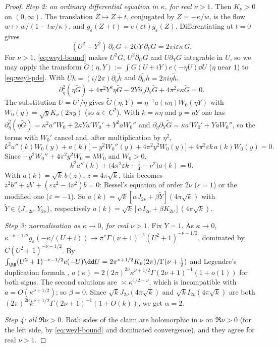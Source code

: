 \begin{proof}
\emph{Step 2: an ordinary differential equation in $\kappa$, for real $\nu>1$.} Then $K_\nu>0$ on $(0,\infty)$. The translation
$Z\mapsto Z+t$, conjugated by $Z=-\kappa/w$, is the flow $w\mapsto w/(1-tw/\kappa)$, and $g_\varepsilon(Z+t)=e(\varepsilon t)g_\varepsilon(Z)$.
Differentiating at $t=0$ gives
\begin{equation}\label{eq:weyl-pde}
(U^2-Y^2)\,\partial_UG+2UY\,\partial_YG=2\pi i\varepsilon\kappa\,G .
\end{equation}
For $\nu>1$, \eqref{eq:weyl-bound} makes $U^2G$, $U^2\partial_UG$ and $U\partial_YG$ integrable in $U$, so we may apply the transform
$\widetilde G(\eta,Y):=\int G(U+iY)e(-\eta U)\dd U$ ($\eta$ near $1$) to \eqref{eq:weyl-pde}. With $\widetilde{Uh}=(i/2\pi)\partial_\eta\widetilde h$ and
$\widetilde{\partial_Uh}=2\pi i\eta\widetilde h$,
\[
\partial_\eta^2(\eta\widetilde G)+4\pi^2Y^2\eta\widetilde G-2Y\partial_\eta\partial_Y\widetilde G+4\pi^2\varepsilon\kappa\widetilde G=0 .
\]
The substitution $U=U'/\eta$ gives $\widetilde G(\eta,Y)=\eta^{-1}a(\kappa\eta)W_0(\eta Y)$ with $W_0(y)=\sqrt yK_\nu(2\pi y)$ (so $a\in C^2$). With
$k=\kappa\eta$ and $y=\eta Y$ one has $\partial_\eta^2(\eta\widetilde G)=\kappa^2a''W_0+2\kappa Ya'W_0'+Y^2aW_0''$ and
$\partial_\eta\partial_Y\widetilde G=\kappa a'W_0'+YaW_0''$, so the terms with $W_0'$ cancel and, after multiplication by $\eta^2$,
\[
k^2a''(k)W_0(y)+a(k)\big[-y^2W_0''(y)+4\pi^2y^2W_0(y)\big]+4\pi^2\varepsilon k\,a(k)W_0(y)=0 .
\]
Since $-y^2W_0''+4\pi^2y^2W_0=\lambda W_0$ and $W_0>0$,
\begin{equation}\label{eq:weyl-ode}
k^2a''(k)+\big(4\pi^2\varepsilon k+\tfrac14-\nu^2\big)a(k)=0 .
\end{equation}
With $a(k)=\sqrt k\,b(z)$, $z=4\pi\sqrt k$, this becomes $z^2b''+zb'+(\varepsilon z^2-4\nu^2)b=0$: Bessel's equation of order $2\nu$
($\varepsilon=1$) or the modified one ($\varepsilon=-1$). So $a(k)=\sqrt k[\alpha J_{2\nu}+\beta\tilde Y](4\pi\sqrt k)$ with $\tilde Y\in\{J_{-2\nu},Y_{2\nu}\}$,
respectively $a(k)=\sqrt k[\alpha I_{2\nu}+\beta K_{2\nu}](4\pi\sqrt k)$.

\emph{Step 3: normalisation as $\kappa\to0$, for real $\nu>1$.} Fix $Y=1$. As $\kappa\to0$,
$\kappa^{-\nu-1/2}g_\varepsilon(-\kappa/(U+i))\to\pi^\nu\Gamma(\nu+1)^{-1}(U^2+1)^{-\nu-1/2}$, dominated by $C(U^2+1)^{-\nu-1/2}$. By
$\int_\RR(U^2+1)^{-\nu-1/2}e(-U)\dd U=2\pi^{\nu+1/2}K_\nu(2\pi)/\Gamma(\nu+\frac12)$ \cite[10.32.11]{DLMF} and Legendre's duplication formula \cite[5.5.5]{DLMF},
$a(\kappa)=2(2\pi)^{2\nu}\kappa^{\nu+1/2}\Gamma(2\nu+1)^{-1}(1+o(1))$ for both signs. The second solutions are $\asymp\kappa^{1/2-\nu}$, which is
incompatible with $a=O(\kappa^{\nu+1/2})$; so $\beta=0$. Since $\sqrt kJ_{2\nu}(4\pi\sqrt k)$ and $\sqrt kI_{2\nu}(4\pi\sqrt k)$ are both
$(2\pi)^{2\nu}k^{\nu+1/2}\Gamma(2\nu+1)^{-1}(1+O(k))$, we get $\alpha=2$.

\emph{Step 4: all $\Re\nu>0$.} Both sides of the claim are holomorphic in $\nu$ on $\Re\nu>0$ (for the left side, by \eqref{eq:weyl-bound} and
dominated convergence), and they agree for real $\nu>1$.
\end{proof}

